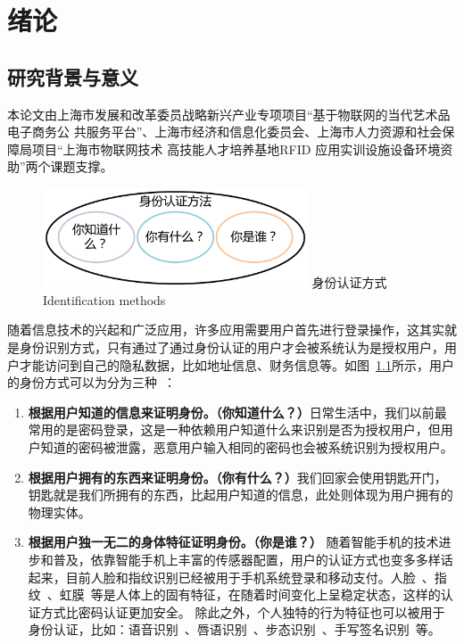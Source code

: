 
\chapter{绪论}
\label{chap:intro}
\section{研究背景与意义}
本论文由上海市发展和改革委员战略新兴产业专项项目“基于物联网的当代艺术品电子商务公
共服务平台”、上海市经济和信息化委员会、上海市人力资源和社会保障局项目“上海市物联网技术
高技能人才培养基地RFID 应用实训设施设备环境资助”两个课题支撑。

\begin{figure}[!htp]
  \centering
  \includegraphics[width=0.7\textwidth]{figure/identification-method.pdf}
  \bicaption
    {身份认证方式}
    {Identification methods}
  \label{fig:identification-method}
\end{figure}
随着信息技术的兴起和广泛应用，许多应用需要用户首先进行登录操作，这其实就是身份识别方式，只有通过了通过身份认证的用户才会被系统认为是授权用户，用户才能访问到自己的隐私数据，比如地址信息、财务信息等。如图~\ref{fig:identification-method}所示，用户的身份方式可以为分为三种~\cite{Huang2011A}：
\begin{enumerate}[label=(\arabic*)]
    \item \textbf{根据用户知道的信息来证明身份。（你知道什么？）}日常生活中，我们以前最常用的是密码登录，这是一种依赖用户知道什么来识别是否为授权用户，但用户知道的密码被泄露，恶意用户输入相同的密码也会被系统识别为授权用户。
    \item \textbf{根据用户拥有的东西来证明身份。（你有什么？）}我们回家会使用钥匙开门，钥匙就是我们所拥有的东西，比起用户知道的信息，此处则体现为用户拥有的物理实体。
    \item \textbf{根据用户独一无二的身体特征证明身份。（你是谁？）} 随着智能手机的技术进步和普及，依靠智能手机上丰富的传感器配置，用户的认证方式也变多多样话起来，目前人脸和指纹识别已经被用于手机系统登录和移动支付。人脸~\cite{12717}、指纹~\cite{Andrew2005Handbook}、虹膜~\cite{Wildes1997Iris}等是人体上的固有特征，在随着时间变化上呈稳定状态，这样的认证方式比密码认证更加安全。 除此之外，个人独特的行为特征也可以被用于身份认证，比如：语音识别~\cite{Rashid2008Security}、唇语识别~\cite{Cetingul2006Discriminative}、步态识别~\cite{Boulgouris2005Gait}、手写签名识别~\cite{Plamondona1989Automatic}等。 
\end{enumerate}

